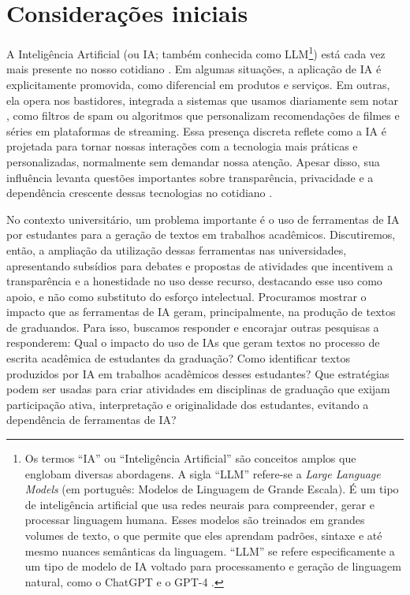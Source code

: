 \documentclass[portuguese]{textolivre}
\begin{document}
\section{Considerações iniciais}
A Inteligência Artificial (ou IA; também conhecida como LLM\footnote{Os termos ``IA'' ou ``Inteligência Artificial'' são conceitos amplos que englobam diversas abordagens. A sigla ``LLM'' refere-se a \textit{Large Language Models} (em português: Modelos de Linguagem de Grande Escala). É um tipo de inteligência artificial que usa redes neurais para compreender, gerar e processar linguagem humana. Esses modelos são treinados em grandes volumes de texto, o que permite que eles aprendam padrões, sintaxe e até mesmo nuances semânticas da linguagem. ``LLM'' se refere especificamente a um tipo de modelo de IA voltado para processamento e geração de linguagem natural, como o ChatGPT e o GPT-4 \cite{rodrigues2023}.}) está cada vez mais presente no nosso cotidiano \cite{carvalho2021, faceli2021}. Em algumas situações, a aplicação de IA é explicitamente promovida, como diferencial em produtos e serviços. Em outras, ela opera nos bastidores, integrada a sistemas que usamos diariamente sem notar \cite{carvalho2021}, como filtros de spam ou algoritmos que personalizam recomendações de filmes e séries em plataformas de streaming. Essa presença discreta reflete como a IA é projetada para tornar nossas interações com a tecnologia mais práticas e personalizadas, normalmente sem demandar nossa atenção. Apesar disso, sua influência levanta questões importantes sobre transparência, privacidade e a dependência crescente dessas tecnologias no cotidiano \cite{carvalho2021}.

No contexto universitário, um problema importante é o uso de ferramentas de IA por estudantes para a geração de textos em trabalhos acadêmicos. Discutiremos, então, a ampliação da utilização dessas ferramentas nas universidades, apresentando subsídios para debates e propostas de atividades que incentivem a transparência e a honestidade no uso desse recurso, destacando esse uso como apoio, e não como substituto do esforço intelectual. Procuramos mostrar o impacto que as ferramentas de IA geram, principalmente, na produção de textos de graduandos. Para isso, buscamos responder e encorajar outras pesquisas a responderem: Qual o impacto do uso de IAs que geram textos no processo de escrita acadêmica de estudantes da graduação? Como identificar textos produzidos por IA em trabalhos acadêmicos desses estudantes? Que estratégias podem ser usadas para criar atividades em disciplinas de graduação que exijam participação ativa, interpretação e originalidade dos estudantes, evitando a dependência de ferramentas de IA?
\end{document}

